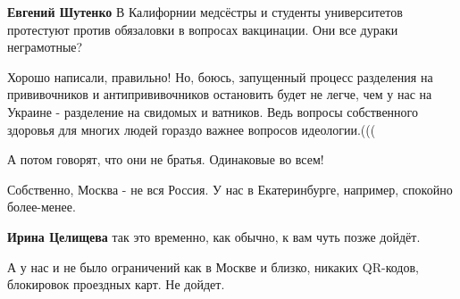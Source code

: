 \begin{itemize}
\begin{itemize}
\textbf{Евгений Шутенко} В Калифорнии медсёстры и студенты университетов протестуют против обязаловки в вопросах вакцинации. Они все дураки неграмотные?

\end{itemize}

 

Хорошо написали, правильно! Но, боюсь, запущенный процесс разделения на
прививочников и антипрививочников остановить будет не легче, чем у нас на
Украине - разделение на свидомых и ватников. Ведь вопросы собственного здоровья
для многих людей гораздо важнее вопросов идеологии.(((


 
А потом говорят, что они не братья. Одинаковые во всем!

 
Собственно, Москва - не вся Россия. У нас в Екатеринбурге, например, спокойно более-менее.

\begin{itemize}
 
\textbf{Ирина Целищева} так это временно, как обычно, к вам чуть позже дойдёт.

 
А у нас и не было ограничений как в Москве и близко, никаких QR-кодов, блокировок проездных карт. Не дойдет.
\end{itemize}


\end{itemize}
